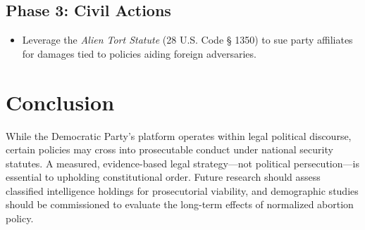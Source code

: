 \documentclass[11pt]{article}
\begin{document}
\subsection{Phase 3: Civil Actions}
\begin{itemize}
    \item Leverage the \textit{Alien Tort Statute} (28 U.S. Code § 1350) to sue party affiliates for damages tied to policies aiding foreign adversaries.
\end{itemize}

\section{Conclusion}
While the Democratic Party’s platform operates within legal political discourse, certain policies may cross into prosecutable conduct under national security statutes. A measured, evidence-based legal strategy—not political persecution—is essential to upholding constitutional order. Future research should assess classified intelligence holdings for prosecutorial viability, and demographic studies should be commissioned to evaluate the long-term effects of normalized abortion policy.
\end{document}
